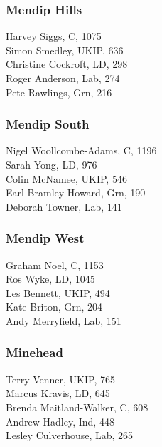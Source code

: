 \documentclass[a4paper,openany,10pt]{book}
\begin{document}
\subsubsection*{Mendip Hills}



Harvey Siggs, C, 1075\\
Simon Smedley, UKIP, 636\\
Christine Cockroft, LD, 298\\
Roger Anderson, Lab, 274\\
Pete Rawlings, Grn, 216\\


\subsubsection*{Mendip South}



{Nigel Woollcombe-Adams}, C, 1196\\
Sarah Yong, LD, 976\\
Colin McNamee, UKIP, 546\\
Earl Bramley-Howard, Grn, 190\\
Deborah Towner, Lab, 141\\


\subsubsection*{Mendip West}



Graham Noel, C, 1153\\
Ros Wyke, LD, 1045\\
Les Bennett, UKIP, 494\\
Kate Briton, Grn, 204\\
Andy Merryfield, Lab, 151\\


\subsubsection*{Minehead}



Terry Venner, UKIP, 765\\
Marcus Kravis, LD, 645\\
{Brenda Maitland-Walker}, C, 608\\
Andrew Hadley, Ind, 448\\
Lesley Culverhouse, Lab, 265\\
\end{document}
